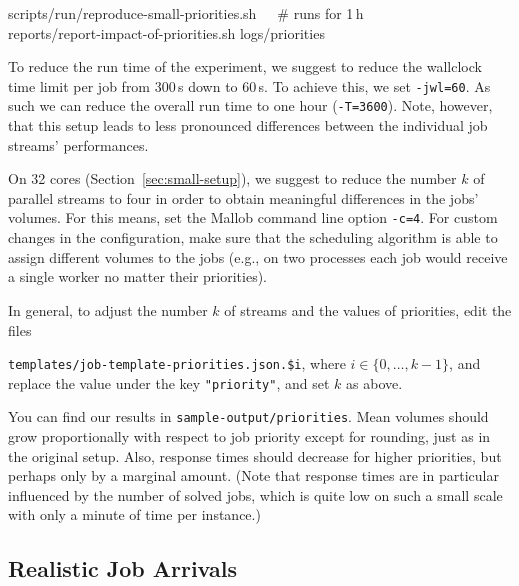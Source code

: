 \documentclass[runningheads]{article}
\numberwithin{dummy}{subsection}
\begin{document}
\begin{tcolorbox}[
  colback=Magenta!5!white,
  colframe=Magenta!75!black,
  title={\centering Commands for Small Setup}]
\begin{ttfenvcompact}
scripts/run/reproduce-small-priorities.sh\ \ \ \# runs for 1\,h\\
reports/report-impact-of-priorities.sh logs/priorities
\end{ttfenvcompact}
\end{tcolorbox}

To reduce the run time of the experiment, we suggest to reduce the wallclock time limit per job from 300\,s down to 60\,s.
To achieve this, we set \texttt{-jwl=60}.
As such we can reduce the overall run time to one hour (\texttt{-T=3600}).
Note, however, that this setup leads to less pronounced differences between the individual job streams' performances.

On 32 cores (Section~\ref{sec:small-setup}), we suggest to reduce the number $k$ of parallel streams to four in order to obtain meaningful differences in the jobs' volumes.
For this means, set the Mallob command line option \texttt{-c=4}.
For custom changes in the configuration, make sure that the scheduling algorithm is able to assign different volumes to the jobs (e.g., on two processes each job would receive a single worker no matter their priorities).

In general, to adjust the number $k$ of streams and the values of priorities, edit the files 

\texttt{templates/job-template-priorities.json.\$i}, where $i \in \{0,\ldots,k-1\}$, and replace the value under the key \texttt{"priority"}, and set $k$ as above. 

You can find our results in \texttt{sample-output/priorities}.
Mean volumes should grow proportionally with respect to job priority except for rounding, just as in the original setup.
Also, response times should decrease for higher priorities, but perhaps only by a marginal amount.
(Note that response times are in particular influenced by the number of solved jobs, which is quite low on such a small scale with only a minute of time per instance.)









\subsection{Realistic Job Arrivals}
\end{document}
